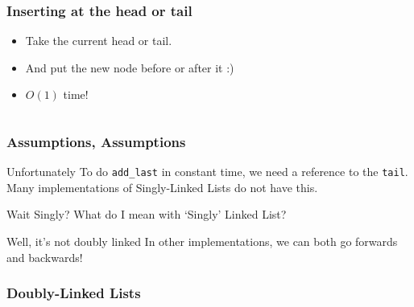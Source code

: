 \begin{frame}
	\frametitle{Inserting at the head or tail}
	\begin{itemize}
		\item Take the current head or tail.
		\item And put the new node before or after it :)
		\item<4-> \alert{$O(1)$ time!}
	\end{itemize}	
	\begin{columns}[t]
			
	\end{columns}
\end{frame}

\begin{frame}
	\frametitle{Assumptions, Assumptions}
	\begin{alertblock}{Unfortunately}
		To do \texttt{add\_last} in constant time, we need a reference to the \texttt{tail}.\\
		Many implementations of Singly-Linked Lists do not have this.
	\end{alertblock}		
	\pause
	\begin{questionblock}{Wait Singly?}
		What do I mean with `Singly' Linked List?	
	\end{questionblock}
	\pause
	\begin{answerblock}{Well, it's not doubly linked}
		In other implementations, we can both go forwards and backwards!	
	\end{answerblock}
\end{frame}

\begin{frame}
	\frametitle{Doubly-Linked Lists}
	\begin{overlayarea}{\textwidth}{0.5\textheight}
		\begin{center}
			
		\end{center}
	\end{overlayarea}
\end{frame}

